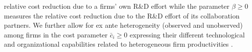 relative cost reduction due to a firms' own R\&D effort while the parameter $\beta \ge 0$ \label{sym:beta} measures the relative cost reduction due to
the R\&D effort of its collaboration partners. %
We further allow for ex ante heterogeneity (observed and unobserved) among firms in the cost parameter $\bar c_i \ge 0$
expressing their different technological and organizational capabilities related to heterogeneous firm productivities \citep[][]{Banerjee2005, Blundell1995}.

